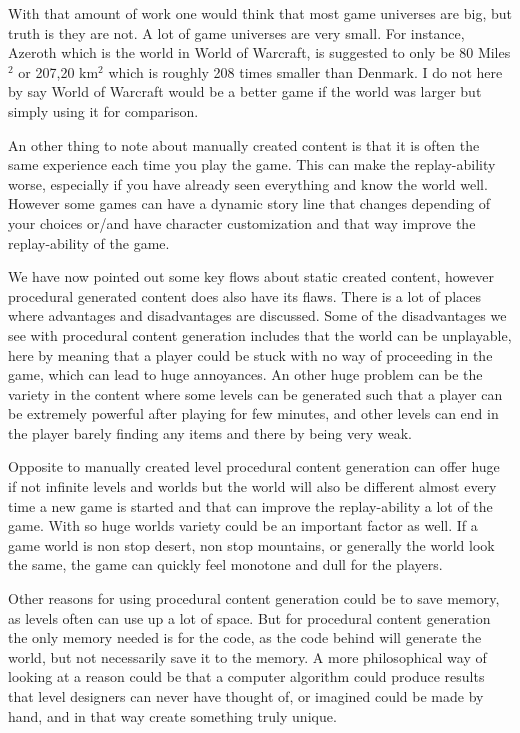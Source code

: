 With that amount of work one would think that most game universes are big, but truth is they are not. A lot of game universes are very small. For instance, Azeroth which is the world in World of Warcraft, is suggested to only be 80 Miles$^2$ or 207,20 km$^2$ \cite{GameWorldSize} which is roughly 208 times smaller than Denmark. I do not here by say World of Warcraft would be a better game if the world was larger but simply using it for comparison.

An other thing to note about manually created content is that it is often the same experience each time you play the game. This can make the replay-ability worse, especially if you have already seen everything and know the world well. However some games can have a dynamic story line that changes depending of your choices or/and have character customization and that way improve the replay-ability of the game.

We have now pointed out some key flows about static created content, however procedural generated content does also have its flaws. There is a lot of places where advantages and disadvantages are discussed. Some of the disadvantages we see with procedural content generation includes that the world can be unplayable, here by meaning that a player could be stuck with no way of proceeding in the game, which can lead to huge annoyances. An other huge problem can be the variety in the content where some levels can be generated such that a player can be extremely powerful after playing for few minutes, and other levels can end in the player barely finding any items and there by being very weak.

Opposite to manually created level procedural content generation can offer huge if not infinite levels and worlds but the world will also be different almost every time a new game is started and that can improve the replay-ability a lot of the game. With so huge worlds variety could be an important factor as well. If a game world is non stop desert, non stop mountains, or generally the world look the same, the game can quickly feel monotone and dull for the players.

Other reasons for using procedural content generation could be to save memory, as levels often can use up a lot of space. But for procedural content generation the only memory needed is for the code, as the code behind will generate the world, but not necessarily save it to the memory. A more philosophical way of looking at a reason could be that a computer algorithm could produce results that level designers can never have thought of, or imagined could be made by hand, and in that way create something truly unique.